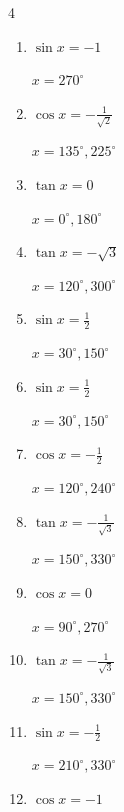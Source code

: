 \begin{multicols}{4}
\begin{enumerate}
        $\displaystyle x = 30^{\circ} , 330^{\circ}$

  \item $\displaystyle \sin{x}  = -1$

        $\displaystyle x = 270^{\circ}$

  \item $\displaystyle \cos{x}  = -\frac{1}{\sqrt{2}}$

        $\displaystyle x = 135^{\circ} , 225^{\circ}$

  \item $\displaystyle \tan{x}  = 0$

        $\displaystyle x = 0^{\circ} , 180^{\circ}$

  \item $\displaystyle \tan{x}  = -\sqrt{3}$

        $\displaystyle x = 120^{\circ} , 300^{\circ}$

  \item $\displaystyle \sin{x}  = \frac{1}{2}$

        $\displaystyle x = 30^{\circ} , 150^{\circ}$

  \item $\displaystyle \sin{x}  = \frac{1}{2}$

        $\displaystyle x = 30^{\circ} , 150^{\circ}$

  \item $\displaystyle \cos{x}  = -\frac{1}{2}$

        $\displaystyle x = 120^{\circ} , 240^{\circ}$

\columnbreak %

  \item $\displaystyle \tan{x}  = -\frac{1}{\sqrt{3}}$

        $\displaystyle x = 150^{\circ} , 330^{\circ}$

  \item $\displaystyle \cos{x}  = 0$

        $\displaystyle x = 90^{\circ} , 270^{\circ}$

  \item $\displaystyle \tan{x}  = -\frac{1}{\sqrt{3}}$

        $\displaystyle x = 150^{\circ} , 330^{\circ}$

  \item $\displaystyle \sin{x}  = -\frac{1}{2}$

        $\displaystyle x = 210^{\circ} , 330^{\circ}$

  \item $\displaystyle \cos{x}  = -1$


\end{enumerate}
\end{multicols}

